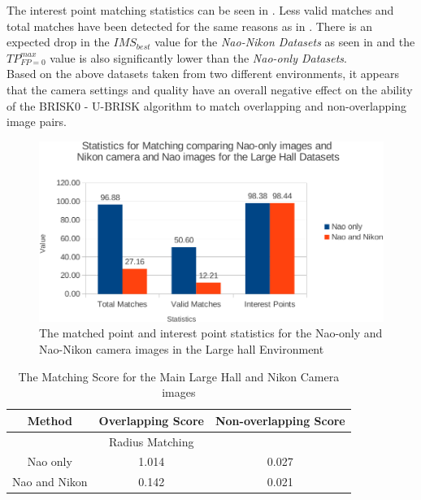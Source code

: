 \documentclass[11pt]{report}
\begin{document}
The interest point matching statistics can be seen in . Less valid matches and total matches have been detected for the same reasons as in . There is an expected drop in the $IMS_{best}$ value for the \textit{Nao-Nikon Datasets} as seen in  and the $TP_{FP=0}^{max}$ value is also significantly lower than the \textit{Nao-only Datasets}.\\

Based on the above datasets taken from two different environments, it appears that the camera settings and quality have an overall negative effect on the ability of the BRISK0 - U-BRISK algorithm to match overlapping and non-overlapping image pairs.\\

\begin{figure}[h!] 
  \centering
    \includegraphics[width=1.0\textwidth]{../Drawings/Graphs/nikon_lh_matches_keypoints_best.pdf}
    \caption{The matched point and interest point statistics for the Nao-only and Nao-Nikon camera images in the Large hall Environment}
    \label{fig:nikon_lh_matches_keypoints}
\end{figure}


\begin{table}
\centering
\caption{The Matching Score for the Main Large Hall and Nikon Camera images}
\begin{tabular}{|c|c|c|}
\hline 
Method & Overlapping Score & Non-overlapping Score\tabularnewline
\hline 
\hline 
 & Radius Matching & \tabularnewline
\hline 
Nao only & 1.014 & 0.027\tabularnewline
\hline 
Nao and Nikon & 0.142 & 0.021\tabularnewline
\hline 
\end{tabular}
\label{tab:ms_nikon_lh}
\end{table}
\end{document}
